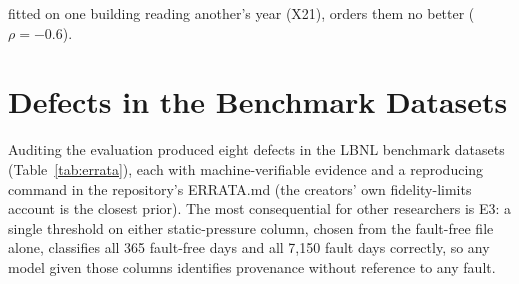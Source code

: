 \documentclass[11pt,letterpaper]{article}
\begin{document}
fitted on one building reading another's year (X21), orders them no better ($\rho = -0.6$).

\section{Defects in the Benchmark Datasets}
\label{sec:errata}

Auditing the evaluation produced eight defects in the LBNL benchmark datasets (Table~\ref{tab:errata}), each with machine-verifiable evidence and a reproducing command in the repository's ERRATA.md (the creators' own fidelity-limits account \cite{casillas2024ahufaultmodels} is the closest prior). The most consequential for other researchers is E3: a single threshold on either static-pressure column, chosen from the fault-free file alone, classifies all 365 fault-free days and all 7{,}150 fault days correctly, so any model given those columns identifies provenance without reference to any fault.
\end{document}
